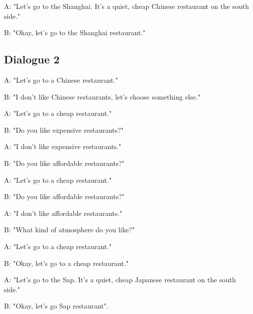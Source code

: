 \begin{appendix}
\begin{minipage}{\textwidth}
{\begin{addmargin}[1em]{2em}
					A: "Let's go to the Shanghai. It's a quiet, cheap Chinese restaurant on the south side."
					
					\hspace*{3mm}B: "Okay, let's go to the Shanghai restaurant."
					
				\end{addmargin}
			}

		\end{minipage}
	
	\subsection{Dialogue 2}
	
	\begin{minipage}{\textwidth}
		{\ttfamily
			\begin{addmargin}[1em]{2em}%
				A: "Let's go to a Chinese restaurant."
				
				\hspace*{3mm}B: "I don't like Chinese restaurants, let's choose something else."
				
				A: "Let's go to a cheap restaurant."
				
				\hspace*{3mm}B: "Do you like expensive restaurants?"
				
				A: "I don't like expensive restaurants."
				
				\hspace*{3mm}B: "Do you like affordable restaurants?"
				
				A: "Let's go to a cheap restaurant."
				
				\hspace*{3mm}B: "Do you like affordable restaurants?"
				
				A: "I don't like affordable restaurants."
				
				\hspace*{3mm}B: "What kind of atmosphere do you like?"
				
				A: "Let's go to a cheap restaurant."
				
				\hspace*{3mm}B: "Okay, let's go to a cheap restaurant."
				
				A: "Let's go to the Sap. It's a quiet, cheap Japanese restaurant on the south side."
				
				\hspace*{3mm}B: "Okay, let's go Sap restaurant".
				
			\end{addmargin}
		}
	\end{minipage}
	

\end{appendix}
